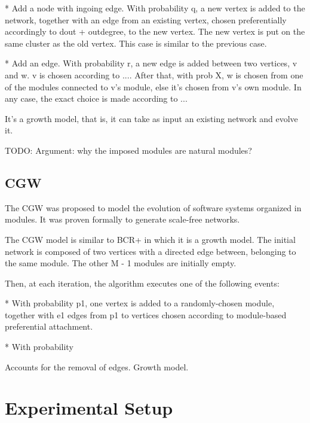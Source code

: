 * Add a node with ingoing edge. With probability q, a new vertex is added to the network, together with an
edge from an existing vertex, chosen preferentially accordingly to dout +
outdegree, to the new vertex. The new vertex is put on the same cluster as the
old vertex. This case is similar to the previous case.

* Add an edge. With probability r, a new edge is added between two vertices, v and w. v is
chosen according to .... After that, with prob X, w is chosen from one of the
modules connected to v's module, else it's chosen from v's own module. In any
case, the exact choice is made according to ...

It's a growth model, that is, it can take as input an existing network and
evolve it.

TODO: Argument: why the imposed modules are natural modules?

\subsection{CGW}

The CGW was proposed to model the evolution of software systems organized in
modules. It was proven formally to generate scale-free networks.

The CGW model is similar to BCR+ in which it is a growth model. The initial
network is composed of two vertices with a directed edge between, belonging
to the same module. The other M - 1 modules are initially empty.

Then, at each iteration, the algorithm executes one of the following events:

* With probability p1, one vertex is added to a randomly-chosen module, together
with e1 edges from p1 to vertices chosen according to module-based preferential
attachment.

* With probability 

Accounts for the removal of edges. Growth model.


\section{Experimental Setup}


